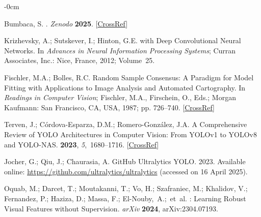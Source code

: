 \documentclass[12pt,a4paper,oneside]{report}
\newlength{\extralength}
\begin{document}
\begin{adjustwidth}{-\extralength}{0cm}
\begin{thebibliography}{999}
Bumbaca, S.
. \emph{Zenodo} 
\textbf{2025}. [\href{http://dx.doi.org/10.5281/zenodo.15235602}{CrossRef}]

Krizhevsky, A.; Sutskever, I.; Hinton, G.E.
 with {{Deep Convolutional Neural
Networks}}.
\newblock In {\em Advances in Neural Information Processing
Systems}; Curran Associates, Inc.: Nice, France, 2012; Volume~25. 

Fischler, M.A.; Bolles, R.C.
\newblock Random {{Sample Consensus}}: {{A Paradigm}} for {{Model Fitting}}
with {{Applications}} to {{Image Analysis}} and {{Automated Cartography}}. In
{\em Readings in {{Computer Vision}}}; Fischler, M.A., Firschein, O., Eds.;
Morgan Kaufmann: San Francisco, CA, USA, 1987; pp. 726--740. [\href{http://dx.doi.org/10.1016/B978-0-08-051581-6.50070-2}{CrossRef}]

Terven, J.; Córdova-Esparza, D.M.; Romero-González, J.A.
\newblock A Comprehensive Review of YOLO Architectures in Computer Vision: From
YOLOv1 to YOLOv8 and YOLO-NAS.
 {\bf 2023}, {\em
5},~1680--1716. [\href{http://dx.doi.org/10.3390/make5040083}{CrossRef}]

Jocher, G.; Qiu, J.; Chaurasia, A.
\newblock GitHub Ultralytics YOLO.  2023. Available online: \url{https://github.com/ultralytics/ultralytics} (accessed on 16 April 2025). 


Oquab, M.; Darcet, T.; Moutakanni, T.; Vo, H.; Szafraniec, M.; Khalidov, V.;
Fernandez, P.; Haziza, D.; Massa, F.; \mbox{{El-Nouby}, A.;  et~al.}
: {{Learning Robust Visual Features}} without
{{Supervision}}. {\em arXiv} {\bf2024}, arXiv:2304.07193. 


\end{thebibliography}
\end{adjustwidth}
\end{document}
